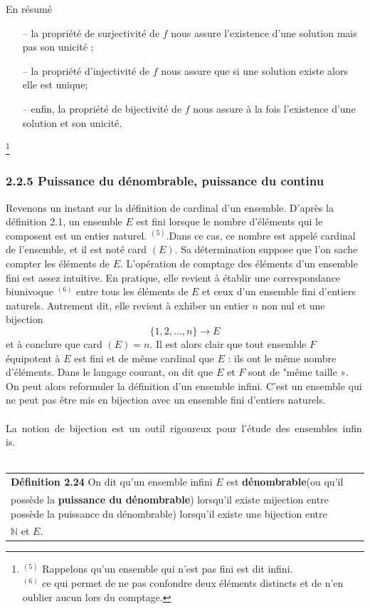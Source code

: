 \documentclass[10pt]{book}
\author{}
\date{}
\begin{document}
En résumé
\begin{itemize}
\item [--]la propriété de surjectivité de $f$ nous assure l'existence d'une solution mais pas son unicité ;
\item [--]la propriété d'injectivité de $f$ nous assure que si une solution existe alors elle est unique;

\item [--]enfin, la propriété de bijectivité de $f$ nous assure à la fois l'existence d'une solution et son unicité.

\end{itemize}
\footnote{${ }^{(5)}$ Rappelons qu'un ensemble qui n'est pas fini est dit infini.\\${ }^{(6)}$ ce qui permet de ne pas confondre deux éléments distincts et de n'en oublier aucun lors du comptage.}
\subsubsection*{2.2.5 Puissance du dénombrable, puissance du continu}
Revenons un instant sur la définition de cardinal d'un ensemble. D'après la définition 2.1, un ensemble $E$ est fini lorsque le nombre d'éléments qui le composent est un entier naturel. ${ }^{(5)}$.Dans ce cas, ce nombre est appelé cardinal de l'ensemble, et il est noté card $(E)$. Sa détermination suppose que l'on sache compter les éléments de $E$. L'opération de comptage des éléments d'un ensemble fini est assez intuitive. En pratique, elle revient à établir une correspondance biunivoque $^{(6)}$ entre tous les éléments de $E$ et ceux d'un ensemble fini d'entiers naturels. Autrement dit, elle revient à exhiber un entier $n$ non nul et une bijection
$$
\{1,2, \ldots, n\} \longrightarrow E
$$
et à conclure que card $(E)=n$. Il est alors clair que tout ensemble $F$ équipotent à $E$ est fini et de même cardinal que $E$ : ils ont le même nombre d'éléments. Dans le langage courant, on dit que $E$ et $F$ sont de "même taille $»$. On peut alors reformuler la définition d'un ensemble infini. C'est un ensemble qui ne peut pas être mis en bijection avec un ensemble fini d'entiers naturels.\\ \\ 
\mbox{La notion de bijection est un outil rigoureux pour l'étude des ensembles infinis.}\\
\\
\hspace{-0.5cm} 
\begin{tabular}{|p{12cm}|}
\hline
\textbf{Définition 2.24} On dit qu'un ensemble infini $E$ est \textbf{dénombrable}(ou qu'il\\
possède la \textbf{puissance du dénombrable}) lorsqu'il existe mijection entre possède la puissance du dénombrable) lorsqu'il existe une bijection entre\\
$\mathbb{N}$ et $E$.\\
\hline
\end{tabular}
\end{document}
